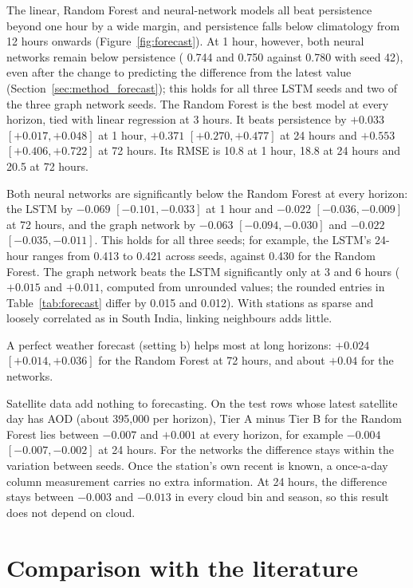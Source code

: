 The linear, Random Forest and neural-network models all beat persistence beyond one hour by a wide
margin, and persistence falls below climatology from 12 hours onwards (Figure~\ref{fig:forecast}).
At 1 hour, however, both neural networks remain below persistence (\rsq{} 0.744 and 0.750 against
0.780 with seed 42), even after the change to predicting the difference from the latest value
(Section~\ref{sec:method_forecast}); this holds for all three LSTM seeds and two of the three graph
network seeds. The Random Forest is the best model at every horizon, tied with linear regression at
3 hours. It beats persistence by $+0.033$ $[+0.017, +0.048]$ at 1 hour, $+0.371$
$[+0.270, +0.477]$ at 24 hours and $+0.553$ $[+0.406, +0.722]$ at 72 hours. Its RMSE is 10.8\ugm{} at
1 hour, 18.8\ugm{} at 24 hours and 20.5\ugm{} at 72 hours.

Both neural networks are significantly below the Random Forest at every horizon: the LSTM by
$-0.069$ $[-0.101, -0.033]$ at 1 hour and $-0.022$ $[-0.036, -0.009]$ at 72 hours, and the graph network
by $-0.063$ $[-0.094, -0.030]$ and $-0.022$ $[-0.035, -0.011]$. This holds for all three seeds; for
example, the LSTM's 24-hour \rsq{} ranges from 0.413 to 0.421 across seeds, against 0.430 for the
Random Forest. The graph network beats the LSTM significantly only at 3 and 6 hours ($+0.015$ and
$+0.011$, computed from unrounded values; the rounded entries in Table~\ref{tab:forecast} differ by
0.015 and 0.012). With
stations as sparse and loosely correlated as in South India, linking neighbours adds little.

A perfect weather forecast (setting b) helps most at long horizons: $+0.024$ $[+0.014, +0.036]$ for
the Random Forest at 72 hours, and about $+0.04$ for the networks.

Satellite data add nothing to forecasting. On the test rows whose latest satellite day has AOD
(about 395,000 per horizon), Tier A minus Tier B for the Random Forest lies between $-0.007$ and
$+0.001$ at every horizon, for example $-0.004$ $[-0.007, -0.002]$ at 24 hours. For the networks the
difference stays within the variation between seeds. Once the station's own recent \pmtf{} is known,
a once-a-day column measurement carries no extra information. At 24 hours, the difference stays
between $-0.003$ and $-0.013$ in every cloud bin and season, so this result does not depend on cloud.

\section{Comparison with the literature}

